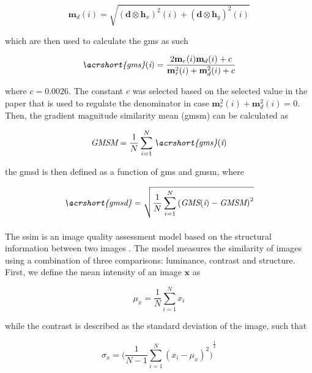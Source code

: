 \documentclass[12pt,oneside]{report}
\begin{document}
\begin{equation}
    \textbf{m}_{d}(i) = 
    \sqrt{
        {(\textbf{d} \otimes \textbf{h}_x)}^2 (i)
        +
        {(\textbf{d} \otimes \textbf{h}_y)}^2 (i)
    }
\end{equation}

which are then used to calculate the \acrshort{gms} as such

\begin{equation}
    \textit{\acrshort{gms}}(\textit{i}) =
    \frac
    {
        2 \textbf{m}_r(i) \textbf{m}_d(i) + c
    }
    {
        \textbf{m}_r^2 (i) + \textbf{m}_d^2 (i) + c
    }
\end{equation}

where $c = 0.0026$. The constant $c$ was selected based on the selected value in the paper \cite{xue_gradient_2014} that is used to regulate the denominator in case $\textbf{m}_r^2 (i) + \textbf{m}_d^2 (i) = 0$. Then, the gradient magnitude similarity mean (\acrshort{gmsm}) can be calculated as

\begin{equation}
    \textit{GMSM} =
    \frac{1}{N} \sum_{i=1}^N \textit{\acrshort{gms}}(\textit{i})
\end{equation}

the \acrshort{gmsd} is then defined as a function of \acrshort{gms} and \acrshort{gmsm}, where

\begin{equation}
    \textit{\acrshort{gmsd}} =
    \sqrt{
        \frac{1}{N} \sum_{i=1}^N
        {(\textit{GMS}(\textit{i}) - \textit{GMSM})}^2
    }
\end{equation}

\paragraph{}
The \acrshort{ssim} is an image quality assessment model based on the structural information between two images \cite{wang_image_2004}. The model measures the similarity of images using a combination of three comparisons: luminance, contrast and structure. First, we define the mean intensity of an image $\textbf{x}$ as

\begin{equation}
    \mu_x = \frac{1}{N} \sum_{i=1}^N x_i
\end{equation}

while the contrast is described as the standard deviation of the image, such that

\begin{equation}
    \sigma_x =
    {\Biggl(
        \frac{1}{N-1} \sum_{i=1}^N {(x_i - \mu_x)}^2
    \Biggl)}^{\frac{1}{2}}
\end{equation}
\end{document}
